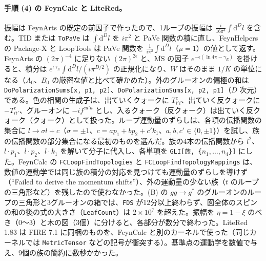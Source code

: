 \documentclass[a4paper,10pt]{ltjsarticle}
\newcommand{\MSbar}{\overline{\mathrm{MS}}}
\begin{document}
\paragraph{手順 (4) の FeynCalc と LiteRed。}振幅は FeynArts の既定の前因子で作ったので、1ループの振幅は $\frac{i}{16\pi^4}\int\mathrm d^Dl$ を含む。TID または \texttt{ToPaVe} は $\int\mathrm d^Dl$ を $i\pi^2$ と PaVe 関数の積に直し、FeynHelpers の Package-X と LoopTools は PaVe 関数を $\frac{1}{i\pi^2}\int\mathrm d^Dl$（$\mu=1$）の値として返す。FeynArts の $(2\pi)^{-4}$ に足りない $(2\pi)^{2\epsilon}$ と、$\MSbar$ の因子 $e^{-\epsilon(\ln4\pi-\gamma_E)}$ を掛けると、積分は $e^{\epsilon\gamma_E}\int\mathrm d^Dl/(i\pi^{D/2})$ の正規化になり、$W$ はそのまま $1/K$ の単位になる（$A_0$、$B_0$ の厳密な値と比べて確かめた）。外のグルーオンの偏極の和は \texttt{DoPolarizationSums[x, p1, p2]}、\texttt{DoPolarizationSums[x, p2, p1]}（$D$ 次元）である。色の相関の生成子は、出ていくクォークに $T^c_{i'i}$、出ていく反クォークに $-T^c_{ii'}$、グルーオンに $-if^{ca'a}$ とし、入るクォーク（反クォーク）は出ていく反クォーク（クォーク）として扱った。ループ運動量のずらしは、各項の伝播関数の集合に $l\to\sigma l+c$（$\sigma=\pm1$、$c=a p_1+b p_2+c' k_1$、$a,b,c'\in\{0,\pm1\}$）を試し、族の伝播関数の部分集合になる最初のものを選んだ。族の4本の伝播関数から $l^2$、$l\cdot p_1$、$l\cdot p_2$、$l\cdot k_1$ を解いて分子に代入し、各単項を \texttt{GLI[族, \{$n_1,\dots,n_4$\}]} にした。FeynCalc の \texttt{FCLoopFindTopologies} と \texttt{FCLoopFindTopologyMappings} は、数値の運動学では同じ族の積分の対応を見つけても運動量のずらしを導けず（``Failed to derive the momentum shifts''）、外の運動量の少ない族（$t$ のループの三角形など）を残したので使わなかった。(B) の $gg\to g^*$ のグルーオンのループの三角形と3グルーオンの箱では、\texttt{FDS} が12分以上終わらず、図全体のスピンの和の後の式の大きさ（\texttt{LeafCount}）は $2\times10^7$ を超えた。振幅を $\eta=1-\xi$ のべき（0〜3）と木の図（3個）に分けると、各部分が数分で終わった。LiteRed 1.83 は FIRE 7.1 に同梱のものを、FeynCalc と別のカーネルで使った（同じカーネルでは \texttt{MetricTensor} などの記号が衝突する）。基準点の運動学を数値で与え、9個の族の簡約に数秒かかった。
\end{document}
